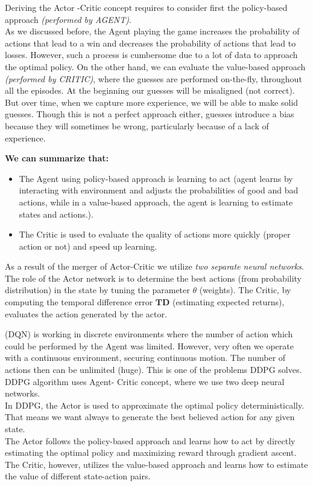 Deriving the Actor -Critic concept requires to consider first the policy-based approach \emph{(performed by AGENT)}.\\
As we discussed before, the Agent playing the game increases the probability of actions that lead to a win and decreases the probability of actions that lead to losses. However, such a process is cumbersome due to a lot of data to approach the optimal policy.
On the other hand, we can evaluate the value-based approach \emph{(performed by CRITIC)}, where the guesses are performed on-the-fly, throughout all the episodes. At the beginning our guesses will be misaligned (not correct). But over time, when we capture more experience, we will be able to make solid guesses. Though this is not a perfect approach either, guesses introduce a bias because they will sometimes be wrong, particularly because of a lack of experience.
\begin{GrayBox}
    \textbf{We can summarize that:}
    \begin{itemize}
        \item The Agent using policy-based approach is learning to act (agent learns by interacting with environment and adjusts the probabilities of good and bad actions, while in a value-based approach, the agent is learning to estimate states and actions.).
        \item The Critic is used to evaluate the quality of actions more quickly (proper action or not) and speed up learning.
    \end{itemize}
    As a result of the merger of Actor-Critic we utilize \emph{two separate neural networks}. The role of the Actor network is to determine the best actions (from probability distribution) in the state by tuning the parameter $\theta$ (weights). The Critic, by computing the temporal difference error $\mathbf{T}\mathbf{D}$ (estimating expected returns), evaluates the action generated by the actor.
\end{GrayBox}

(DQN) is working in discrete environments where the number of action which could be performed by the Agent was limited. However, very often we operate with a continuous environment, securing continuous motion. The number of actions then can be unlimited (huge). This is one of the problems DDPG solves. DDPG algorithm uses Agent- Critic concept, where we use two deep neural networks. \\
In DDPG, the Actor is used to approximate the optimal policy deterministically. That means we want always to generate the best believed action for any given state. \\
The Actor follows the policy-based approach and learns how to act by directly estimating the optimal policy and maximizing reward through gradient ascent. The Critic, however, utilizes the value-based approach and learns how to estimate the value of different state-action pairs.

